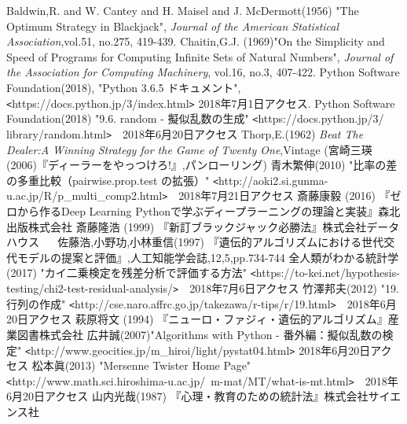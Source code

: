 \begin{thebibliography}{9}
   Baldwin,R. and W. Cantey and H. Maisel and J. McDermott(1956) "The Optimum Strategy in Blackjack", {\it{Journal of the American Statistical Association}},vol.51, no.275, 419-439.
   Chaitin,G.J. (1969)"On the Simplicity and Speed of Programs for Computing Infinite Sets of Natural Numbers", {\it{Journal of the Association for Computing Machinery}}, vol.16, no.3, 407-422.
   Python Software Foundation(2018), "Python 3.6.5 ドキュメント", \verb|<|https://docs.python.jp/3/index.html\verb|>| 2018年7月1日アクセス.
   Python Software Foundation(2018) "9.6. random - 擬似乱数の生成" \verb|<|https://docs.python.jp/3/ library/random.html\verb|>|　2018年6月20日アクセス
   Thorp,E.(1962) {\it{Beat The Dealer:A Winning Strategy for the Game of Twenty One}},Vintage (宮崎三瑛(2006)『ディーラーをやっつけろ!』,パンローリング)
   青木繁伸(2010) "比率の差の多重比較（pairwise.prop.test の拡張）" \verb|<|http://aoki2.si.gunma-u.ac.jp/R/p\_multi\_comp2.html\verb|>|　2018年7月21日アクセス
   斎藤康毅 (2016) 『ゼロから作るDeep Learning Pythonで学ぶディープラーニングの理論と実装』森北出版株式会社
   斎藤隆浩 (1999) 『新訂ブラックジャック必勝法』株式会社データハウス
　 佐藤浩,小野功,小林重信(1997) 『遺伝的アルゴリズムにおける世代交代モデルの提案と評価』,人工知能学会誌,12,5,pp.734-744
   全人類がわかる統計学(2017) "カイ二乗検定を残差分析で評価する方法" \verb|<|https://to-kei.net/hypothesis-testing/chi2-test-residual-analysis/\verb|>|　2018年7月6日アクセス
   竹澤邦夫(2012) "19. 行列の作成" \verb|<|http://cse.naro.affrc.go.jp/takezawa/r-tips/r/19.html\verb|>|　2018年6月20日アクセス
   萩原将文 (1994) 『ニューロ・ファジィ・遺伝的アルゴリズム』産業図書株式会社
  広井誠(2007)"Algorithms with Python - 番外編：擬似乱数の検定" \verb|<|http://www.geocities.jp/m\_hiroi/light/pystat04.html\verb|>| 2018年6月20日アクセス
   松本眞(2013) "Mersenne Twister Home Page" \verb|<|http://www.math.sci.hiroshima-u.ac.jp/~m-mat/MT/what-is-mt.html\verb|>|　2018年6月20日アクセス
   山内光哉(1987) 『心理・教育のための統計法』株式会社サイエンス社
\end{thebibliography}

